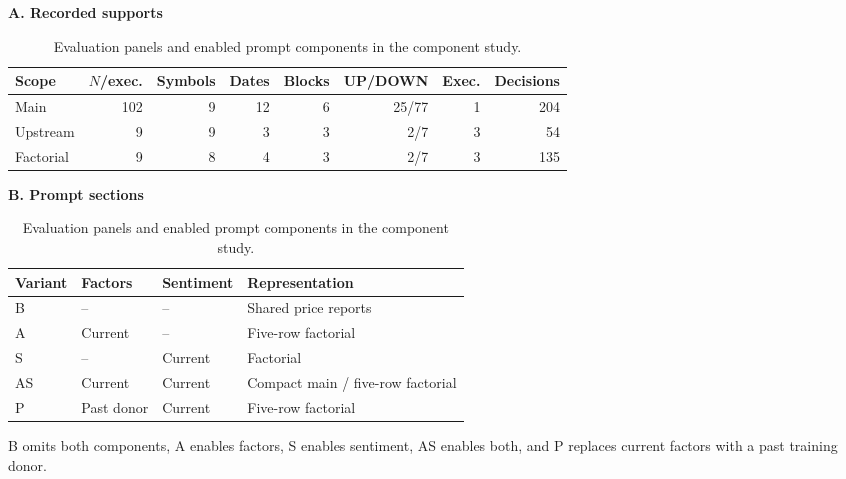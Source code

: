 \begin{table}[!htb]
\centering\small
\setlength{\tabcolsep}{3pt}
\renewcommand{\arraystretch}{1.15}
\caption{Evaluation panels and enabled prompt components in the component study.}
\label{tab:scope}
\textbf{A. Recorded supports}\par\smallskip
\begin{tabular}{lrrrrrrr}
\hline
Scope & $N$/exec. & Symbols & Dates & Blocks & UP/DOWN & Exec. & Decisions \\
\hline
Main & 102 & 9 & 12 & 6 & 25/77 & 1 & 204 \\
Upstream & 9 & 9 & 3 & 3 & 2/7 & 3 & 54 \\
Factorial & 9 & 8 & 4 & 3 & 2/7 & 3 & 135 \\
\hline
\end{tabular}\par\medskip
\textbf{B. Prompt sections}\par\smallskip
\begin{tabular}{llll}
\hline
Variant & Factors & Sentiment & Representation \\
\hline
B & -- & -- & Shared price reports \\
A & Current & -- & Five-row factorial \\
S & -- & Current & Factorial \\
AS & Current & Current & Compact main / five-row factorial \\
P & Past donor & Current & Five-row factorial \\
\hline
\end{tabular}\par\medskip
\begin{minipage}{\textwidth}\footnotesize B omits both components, A enables factors, S enables sentiment, AS enables both, and P replaces current factors with a past training donor.\end{minipage}
\end{table}

